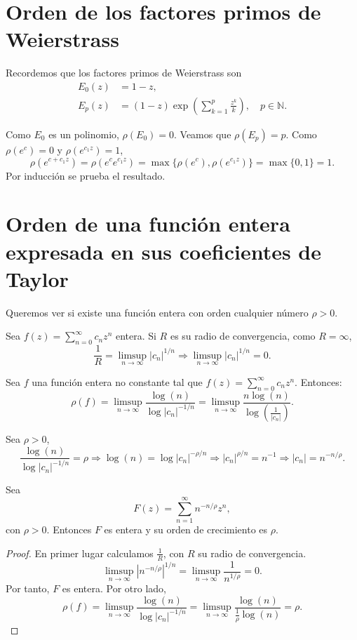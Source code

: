 
\section{Orden de los factores primos de Weierstrass}
Recordemos que los factores primos de Weierstrass son
\begin{align*}
    E_0(z) & = 1-z,                                                                      \\
    E_p(z) & = (1-z)\exp\left(\sum_{k=1}^p \frac{z^k}{k}\right), \quad p \in \mathbb{N}.
\end{align*}

Como $E_0$ es un polinomio, $\rho(E_0) = 0$.
Veamos que $\rho(E_p) = p$.
Como $\rho(e^c) = 0$ y $\rho(e^{c_1z}) = 1$,
$$\rho(e^{c+c_1z}) = \rho(e^ce^{c_1z}) = \max\{\rho(e^c), \rho(e^{c_1z})\} = \max\{0, 1\} = 1.$$
Por inducción se prueba el resultado.

\section{Orden de una función entera expresada en sus coeficientes de Taylor}
Queremos ver si existe una función entera con orden cualquier número $\rho > 0$.

Sea $f(z) = \sum_{n=0}^\infty c_nz^n$ entera.
Si $R$ es su radio de convergencia, como $R = \infty$,
$$\frac{1}{R} = \limsup_{n \to \infty} |c_n|^{1/n} \Rightarrow \limsup_{n \to \infty} |c_n|^{1/n} = 0.$$

\begin{theorem}
    Sea $f$ una función entera no constante tal que $f(z) = \sum_{n=0}^\infty c_nz^n$.
    Entonces:
    $$\rho(f) = \limsup_{n \to \infty} \frac{\log(n)}{\log|c_n|^{-1/n}} = \limsup_{n \to \infty} \frac{n\log(n)}{\log\left(\frac{1}{|c_n|}\right)}.$$
\end{theorem}


Sea $\rho > 0$,
$$\frac{\log(n)}{\log|c_n|^{-1/n}} = \rho \Rightarrow \log(n) = \log|c_n|^{-\rho/n} \Rightarrow |c_n|^{\rho/n} = n^{-1} \Rightarrow |c_n| = n^{-n/\rho}.$$

\begin{corollary}
    Sea
    $$F(z) = \sum_{n=1}^\infty n^{-n/\rho}z^n,$$
    con $\rho > 0$.
    Entonces $F$ es entera y su orden de crecimiento es $\rho$.
\end{corollary}

\begin{proof}
    En primer lugar calculamos $\frac{1}{R}$, con $R$ su radio de convergencia.
    $$\limsup_{n \to \infty} |n^{-n/\rho}|^{1/n} = \limsup_{n \to \infty} \frac{1}{n^{1/\rho}} = 0.$$
    Por tanto, $F$ es entera.
    Por otro lado,
    $$\rho(f) = \limsup_{n \to \infty} \frac{\log(n)}{\log|c_n|^{-1/n}} = \limsup_{n \to \infty} \frac{\log(n)}{\frac{1}{\rho}\log(n)} = \rho.$$
\end{proof}

